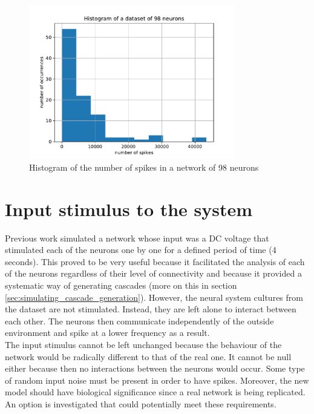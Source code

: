 \begin{figure}[H]
	\centering
	\includegraphics[width=0.8\textwidth]{histogram_number_spikes_dataset.pdf}
	\caption{Histogram of the number of spikes in a network of 98 neurons}
	\label{fig:histogram_spikes}
\end{figure}

\section{Input stimulus to the system}\label{sec:input_stimulus}

Previous work \cite{alexandru2018estimating} simulated a network whose input was a DC voltage that stimulated each of the neurons one by one for a defined period of time (4 seconds). This proved to be very useful because it facilitated the analysis of each of the neurons regardless of their level of connectivity and because it provided a systematic way of generating cascades (more on this in section \ref{sec:simulating_cascade_generation}).
However, the neural system cultures from the dataset are not stimulated. Instead, they are left alone to interact between each other. The neurons then communicate independently of the outside environment and spike at a lower frequency as a result. \\

The input stimulus cannot be left unchanged because the behaviour of the network would be radically different to that of the real one. It cannot be null either because then no interactions between the neurons would occur. Some type of random input noise must be present in order to have spikes. Moreover, the new model should have biological significance since a real network is being replicated. An option is investigated that could potentially meet these requirements.\\

